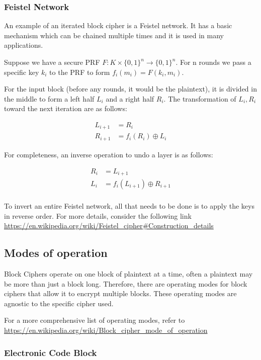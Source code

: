 \documentclass{article}
\begin{document}
\begin{multicols}{2}
\subsubsection{Feistel Network}

An example of an iterated block cipher is a Feistel network. It has a basic mechanism which can be chained multiple times and it is used in many applications.

Suppose we have a secure PRF $F: K \times \{0,1\}^n \rightarrow \{0,1\}^n$. For n rounds we pass a specific key $k_i$ to the PRF to form $f_i(m_i) = F(k_i, m_i)$. 

For the input block (before any rounds, it would be the plaintext), it is divided in the middle to form a left half $L_i$ and a right half $R_i$. The transformation of $L_i, R_i$ toward the next iteration are as follows:

\[
\begin{split}
    L_{i+1} &= R_i\\
    R_{i+1} &= f_i(R_i) \oplus L_i
\end{split}
\]

For completeness, an inverse operation to undo a layer is as follows:

\[
\begin{split}
    R_i &= L_{i+1}\\
    L_i &= f_i(L_{i+1}) \oplus R_{i+1}\\
\end{split}
\]

To invert an entire Feistel network, all that needs to be done is to apply the keys in reverse order. For more details, consider the following link \url{https://en.wikipedia.org/wiki/Feistel_cipher#Construction_details}

\subsection{Modes of operation}

Block Ciphers operate on one block of plaintext at a time, often a plaintext may be more than just a block long. Therefore, there are operating modes for block ciphers that allow it to encrypt multiple blocks. These operating modes are agnostic to the specific cipher used. 

For a more comprehensive list of operating modes, refer to \url{https://en.wikipedia.org/wiki/Block_cipher_mode_of_operation}

\subsubsection{Electronic Code Block}


\end{multicols}
\end{document}
